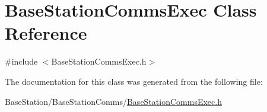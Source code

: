 \hypertarget{classBaseStationCommsExec}{\section{Base\-Station\-Comms\-Exec Class Reference}
\label{classBaseStationCommsExec}
}


{\ttfamily \#include $<$Base\-Station\-Comms\-Exec.\-h$>$}



The documentation for this class was generated from the following file\-:\begin{DoxyCompactItemize}
\item 
Base\-Station/\-Base\-Station\-Comms/\hyperlink{BaseStationCommsExec_8h}{Base\-Station\-Comms\-Exec.\-h}\end{DoxyCompactItemize}
